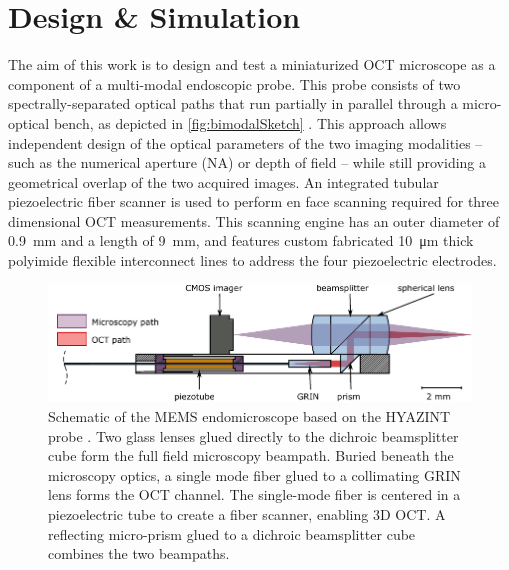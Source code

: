 %

\chapter{Design \& Simulation}
\label{Ch:DesignSimulation}	

The aim of this work is to design and test a miniaturized OCT microscope as a component of a multi-modal endoscopic probe. This probe consists of two spectrally-separated optical paths that run partially in parallel through a micro-optical bench, as depicted in \autoref{fig:bimodalSketch} \cite{Kretschmer}. This approach allows independent design of the optical parameters of the two imaging modalities -- such as the numerical aperture (NA) or depth of field -- while still providing a geometrical overlap of the two acquired images. An integrated tubular piezoelectric fiber scanner is used to perform en face scanning required for three dimensional OCT measurements. This scanning engine has an outer diameter of \SI{0.9}{\milli\meter} and a length of \SI{9}{\milli\meter}, and features custom fabricated \SI{10}{\micro\meter} thick polyimide flexible interconnect lines to address the four piezoelectric electrodes.

\begin{figure}[h!]\centering
      \includegraphics{figures/30_DesignSimulation/Overview/bimodalCrossSection.pdf}
      \caption{Schematic of the MEMS endomicroscope based on the HYAZINT probe \cite{Blattmann}. Two glass lenses glued directly to the dichroic beamsplitter cube form the full field microscopy beampath. Buried beneath the microscopy optics, a single mode fiber glued to a collimating GRIN lens forms the OCT channel. The single-mode fiber is centered in a piezoelectric tube to create a fiber scanner, enabling 3D OCT. A reflecting micro-prism glued to a dichroic beamsplitter cube combines the two beampaths.}
      \label{fig:bimodalSketch}
\end{figure}

